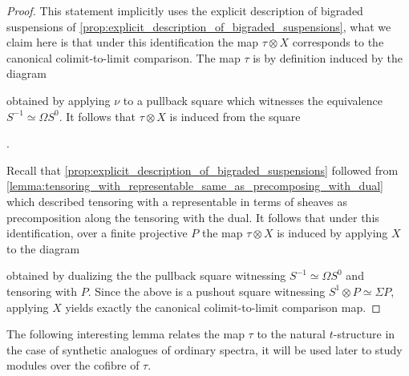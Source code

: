 \documentclass[oneside,a4paper]{amsart}
\theoremstyle{plain}
\theoremstyle{definition}
\theoremstyle{remark}
\begin{document}
\begin{proof}
This statement implicitly uses the explicit description of bigraded suspensions of \cref{prop:explicit_description_of_bigraded_suspensions}, what we claim here is that under this identification the map $\tau \otimes X$ corresponds to the canonical colimit-to-limit comparison. The map $\tau$ is by definition induced by the diagram 

\begin{center}
\end{center}
obtained by applying $\nu$ to a pullback square which witnesses the equivalence $S^{-1} \simeq \Omega S^{0}$. It follows that $\tau \otimes X$ is induced from the square 

\begin{center}
	.
\end{center}
Recall that \cref{prop:explicit_description_of_bigraded_suspensions} followed from \cref{lemma:tensoring_with_representable_same_as_precomposing_with_dual} which described tensoring with a representable in terms of sheaves as precomposition along the tensoring with the dual. It follows that under this identification, over a finite projective $P$ the map $\tau \otimes X$ is induced by applying $X$ to the diagram 

\begin{center}
\end{center}
obtained by dualizing the the pullback square witnessing $S^{-1} \simeq \Omega S^{0}$ and tensoring with $P$. Since the above is a pushout square witnessing $S^{1} \otimes P \simeq \Sigma P$, applying $X$ yields exactly the canonical colimit-to-limit comparison map. 
\end{proof}
The following interesting lemma relates the map $\tau$ to the natural $t$-structure in the case of synthetic analogues of ordinary spectra, it will be used later to study modules over the cofibre of $\tau$. 
\end{document}
